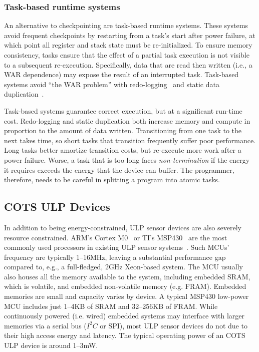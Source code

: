 \subsubsection{Task-based runtime systems}
An alternative to checkpointing are task-based runtime systems.
% 
These systems avoid frequent checkpoints by
restarting from a task's start after power failure,
at which point all register and stack state must be re-initialized.
% 
To ensure memory consistency, tasks ensure that the effect of a
partial task execution is not visible to a subsequent re-execution.
Specifically, data that are read then written (i.e., a WAR dependence) may expose the result of an interrupted task.
% 
Task-based systems avoid ``the WAR problem'' with
redo-logging~\cite{alpaca} and static data duplication~\cite{chain}.


Task-based systems guarantee correct execution, but at a significant run-time cost.
% 
Redo-logging and static duplication both increase memory and compute
in proportion to the amount of data written.
% 
Transitioning from one task to the next takes time, so
short tasks that transition frequently suffer poor performance.
Long tasks better amortize transition costs,
but re-execute more work after a power failure.
% 
Worse, a task that is too long faces {\em non-termination} if the energy it
requires exceeds the energy that the device can buffer.
% 
The programmer, therefore, needs to be careful in splitting a program into atomic tasks.

\subsection{COTS ULP Devices}
In addition to being energy-constrained, ULP sensor devices are also severely resource constrained.
% 
ARM's Cortex M0~\cite{cortexm0} or TI's MSP430~\cite{msp430fr5994} are 
the most commonly used processors in existing ULP sensor
systems~\cite{wisp,capybara,flicker,ufop,amulet,wolverine}.
%
Such MCUs' frequency are typically 1--16MHz, leaving a
substantial performance gap compared to, e.g., a full-fledged, 2GHz Xeon-based
system.  
%
The MCU usually also houses all the memory available to
the system, including embedded SRAM, which is volatile, and embedded non-volatile memory (e.g. FRAM).  
%
Embedded memories are small and capacity varies by device. 
% 
A typical MSP430
low-power MCU includes just 1--4KB of SRAM and 32--256KB of FRAM.
% 
While
continuously powered (i.e. wired) embedded systems may interface with larger memories
via a serial bus ($I^{2}C$ or SPI), most ULP sensor devices do
not due to their high access energy and latency.
%
The typical operating power of an COTS ULP device is around 1--3mW.

